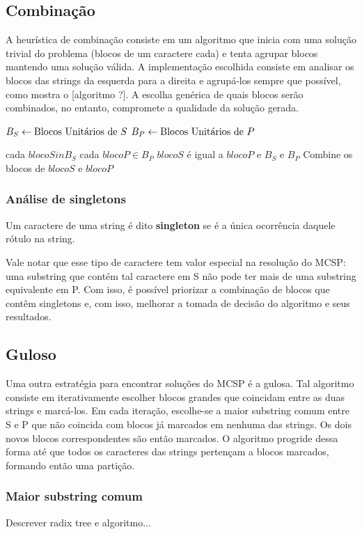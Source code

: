 
\subsection{Combinação}

    A heurística de combinação consiste em um algoritmo que inicia com uma solução trivial do problema (blocos de um caractere cada) e tenta agrupar blocos mantendo uma solução válida. A implementação escolhida consiste em analisar os blocos das strings da esquerda para a direita e agrupá-los sempre que possível, como mostra o [algoritmo ?]. A escolha genérica de quais blocos serão combinados, no entanto, compromete a qualidade da solução gerada.

    \begin{codebox}

    \li $B_S \leftarrow \text{Blocos Unitários de } S$
    \li $B_P \leftarrow \text{Blocos Unitários de } P$

    \li \Para cada $blocoS in B_S$ \Faca \Do
    \li     \Para cada $blocoP \in B_P$ \Faca \Do
    \li         \Se $blocoS$ é igual a $blocoP$ e  $B_S$ e  $B_P$  \Do
    \li             \Entao Combine os blocos de $blocoS$ e $blocoP$
    \End
    \end{codebox}

    \subsubsection{Análise de singletons}
    
        \begin{definition}
            Um caractere de uma string é dito \textbf{singleton} se é a única ocorrência daquele rótulo na string.
        \end{definition}

         Vale notar que esse tipo de caractere tem valor especial na resolução do MCSP: uma substring que contém tal caractere em S não pode ter mais de uma substring equivalente em P. Com isso, é possível priorizar a combinação de blocos que contêm singletons e, com isso, melhorar a tomada de decisão do algoritmo e seus resultados.

\subsection{Guloso}

    Uma outra estratégia para encontrar soluções do MCSP é a gulosa. Tal algoritmo consiste em iterativamente escolher blocos grandes que coincidam entre as duas strings e marcá-los. Em cada iteração, escolhe-se a maior substring comum entre S e P que não coincida com blocos já marcados em nenhuma das strings. Os dois novos blocos correspondentes são então marcados. O algoritmo progride dessa forma até que todos os caracteres das strings pertençam a blocos marcados, formando então uma partição.

    \subsubsection{Maior substring comum}

        Descrever radix tree e algoritmo...
